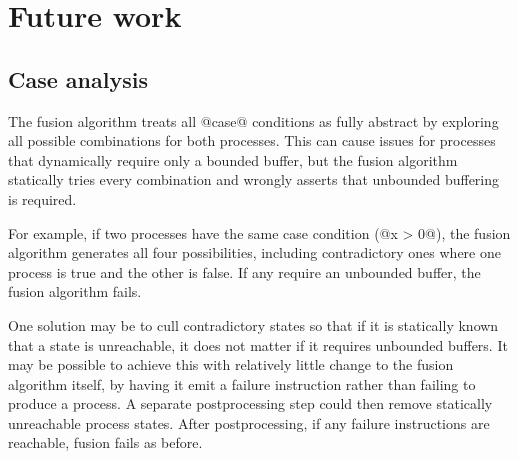 
\section{Future work}
\label{s:FutureWork}


\subsection{Case analysis}
\label{s:FullyAbstractCase}

The fusion algorithm treats all @case@ conditions as fully abstract by exploring all possible combinations for both processes.
This can cause issues for processes that dynamically require only a bounded buffer, but the fusion algorithm statically tries every combination and wrongly asserts that unbounded buffering is required.

For example, if two processes have the same case condition (@x > 0@), the fusion algorithm generates all four possibilities, including contradictory ones where one process is true and the other is false.
If any require an unbounded buffer, the fusion algorithm fails.

One solution may be to cull contradictory states so that if it is statically known that a state is unreachable, it does not matter if it requires unbounded buffers.
It may be possible to achieve this with relatively little change to the fusion algorithm itself, by having it emit a failure instruction rather than failing to produce a process.
A separate postprocessing step could then remove statically unreachable process states.
After postprocessing, if any failure instructions are reachable, fusion fails as before.




